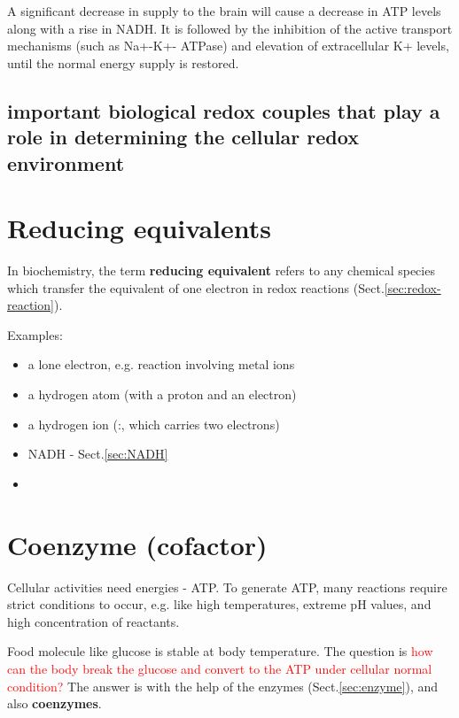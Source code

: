 A significant decrease in  supply to the brain will cause a decrease in
ATP levels along with a rise in NADH. It is followed by the inhibition of the active
transport mechanisms (such as Na+-K+- ATPase) and elevation of extracellular K+
levels, until the normal energy supply is restored.


\subsection{important biological redox couples that play a role in determining
the cellular redox environment}



\section{Reducing equivalents}
\label{sec:reducing-equivalent}

In biochemistry, the term {\bf reducing equivalent} refers to any
chemical species which transfer the equivalent of one electron in redox
reactions (Sect.\ref{sec:redox-reaction}).

Examples:
\begin{itemize}
  \item a lone electron, e.g. reaction involving metal ions
  \item a hydrogen atom (with a proton and an electron)
  \item a hydrogen ion (:, which carries two electrons)
  \item NADH - Sect.\ref{sec:NADH}
  \item {}
\end{itemize}


\section{Coenzyme (cofactor)}
\label{sec:enzyme-coenzyme}
\label{sec:co-enzyme}
\label{sec:apo-enzyme}
\label{sec:holo-enzyme}
\label{sec:cofactor}

Cellular activities need energies - ATP. To generate ATP, many reactions require
strict conditions to occur, e.g. like high temperatures, extreme pH values, and
high concentration of reactants.

Food molecule like glucose is stable at body temperature. The question
is \textcolor{red}{how can the body break the glucose and convert to the
ATP under cellular normal condition?}  The answer is with the help of the
enzymes (Sect.\ref{sec:enzyme}), and also {\bf coenzymes}.


